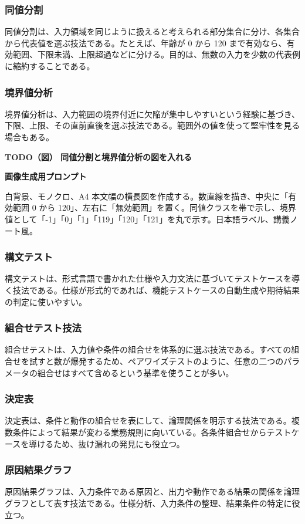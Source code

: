 \documentclass[uplatex,dvipdfmx,a4paper,11pt,nomag]{jsarticle}
\newenvironment{todobox}[2]{\par\medskip\begin{framed}\noindent\textbf{TODO（図） #1}\par\smallskip\noindent\textbf{画像生成用プロンプト}\par\smallskip\noindent #2\par\smallskip}{\end{framed}\par\medskip}
\begin{document}
\subsubsection{同値分割}
同値分割は、入力領域を同じように扱えると考えられる部分集合に分け、各集合から代表値を選ぶ技法である。たとえば、年齢が 0 から 120 まで有効なら、有効範囲、下限未満、上限超過などに分ける。目的は、無数の入力を少数の代表例に縮約することである。

\subsubsection{境界値分析}
境界値分析は、入力範囲の境界付近に欠陥が集中しやすいという経験に基づき、下限、上限、その直前直後を選ぶ技法である。範囲外の値を使って堅牢性を見る場合もある。

\begin{todobox}{同値分割と境界値分析の図を入れる}{白背景、モノクロ、A4 本文幅の横長図を作成する。数直線を描き、中央に「有効範囲 0 から 120」、左右に「無効範囲」を置く。同値クラスを帯で示し、境界値として「-1」「0」「1」「119」「120」「121」を丸で示す。日本語ラベル、講義ノート風。}
\end{todobox}

\subsubsection{構文テスト}
構文テストは、形式言語で書かれた仕様や入力文法に基づいてテストケースを導く技法である。仕様が形式的であれば、機能テストケースの自動生成や期待結果の判定に使いやすい。

\subsubsection{組合せテスト技法}
組合せテストは、入力値や条件の組合せを体系的に選ぶ技法である。すべての組合せを試すと数が爆発するため、ペアワイズテストのように、任意の二つのパラメータの組合せはすべて含めるという基準を使うことが多い。

\subsubsection{決定表}
決定表は、条件と動作の組合せを表にして、論理関係を明示する技法である。複数条件によって結果が変わる業務規則に向いている。各条件組合せからテストケースを導けるため、抜け漏れの発見にも役立つ。

\subsubsection{原因結果グラフ}
原因結果グラフは、入力条件である原因と、出力や動作である結果の関係を論理グラフとして表す技法である。仕様分析、入力条件の整理、結果条件の特定に役立つ。
\end{document}
